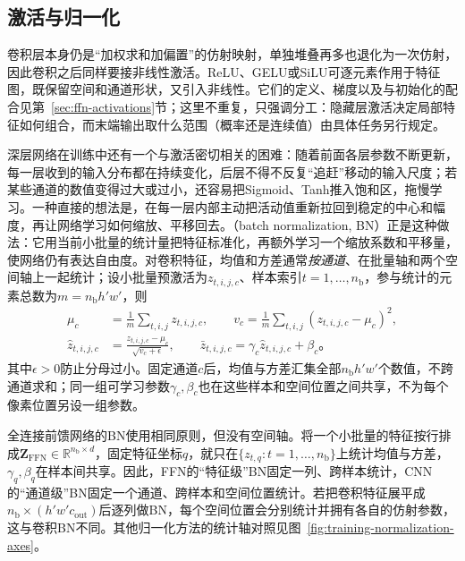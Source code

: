 \subsection{激活与归一化}
\label{sec:cnn-activation-normalization}

卷积层本身仍是“加权求和加偏置”的仿射映射，单独堆叠再多也退化为一次仿射，因此卷积之后同样要接非线性激活。ReLU、GELU或SiLU可逐元素作用于特征图，既保留空间和通道形状，又引入非线性。它们的定义、梯度以及与初始化的配合见第~\ref{sec:ffn-activations}节；这里不重复，只强调分工：隐藏层激活决定局部特征如何组合，而末端输出取什么范围（概率还是连续值）由具体任务另行规定。

深层网络在训练中还有一个与激活密切相关的困难：随着前面各层参数不断更新，每一层收到的输入分布都在持续变化，后层不得不反复“追赶”移动的输入尺度；若某些通道的数值变得过大或过小，还容易把Sigmoid、Tanh推入饱和区，拖慢学习。一种直接的想法是，在每一层内部主动把活动值重新拉回到稳定的中心和幅度，再让网络学习如何缩放、平移回去。（batch normalization, BN）正是这种做法：它用当前小批量的统计量把特征标准化，再额外学习一个缩放系数和平移量，使网络仍有表达自由度。对卷积特征，均值和方差通常\emph{按通道}、在批量轴和两个空间轴上一起统计；设小批量预激活为$z_{t,i,j,c}$、样本索引$t=1,\ldots,n_{\mathrm b}$，参与统计的元素总数为$m=n_{\mathrm b}h'w'$，则
\begin{equation}
  \begin{aligned}
    \mu_c&=\frac1m\sum_{t,i,j}z_{t,i,j,c},\qquad
    v_c=\frac1m\sum_{t,i,j}(z_{t,i,j,c}-\mu_c)^2,\\
    \widehat z_{t,i,j,c}&=\frac{z_{t,i,j,c}-\mu_c}{\sqrt{v_c+\epsilon}},\qquad
    \bar z_{t,i,j,c}=\gamma_c\widehat z_{t,i,j,c}+\beta_c\text{。}
  \end{aligned}
  \label{eq:cnn-batch-normalization}
\end{equation}
其中$\epsilon>0$防止分母过小。固定通道$c$后，均值与方差汇集全部$n_{\mathrm b}h'w'$个数值，不跨通道求和；同一组可学习参数$\gamma_c,\beta_c$也在这些样本和空间位置之间共享，不为每个像素位置另设一组参数。

全连接前馈网络的BN使用相同原则，但没有空间轴。将一个小批量的特征按行排成$\bm Z_{\mathrm{FFN}}\in\mathbb R^{n_{\mathrm b}\times d}$，固定特征坐标$q$，就只在$\{z_{t,q}:t=1,\ldots,n_{\mathrm b}\}$上统计均值与方差，$\gamma_q,\beta_q$在样本间共享。因此，FFN的“特征级”BN固定一列、跨样本统计，CNN的“通道级”BN固定一个通道、跨样本和空间位置统计。若把卷积特征展平成$n_{\mathrm b}\times(h'w'c_{\mathrm{out}})$后逐列做BN，每个空间位置会分别统计并拥有各自的仿射参数，这与卷积BN不同。其他归一化方法的统计轴对照见图~\ref{fig:training-normalization-axes}。

